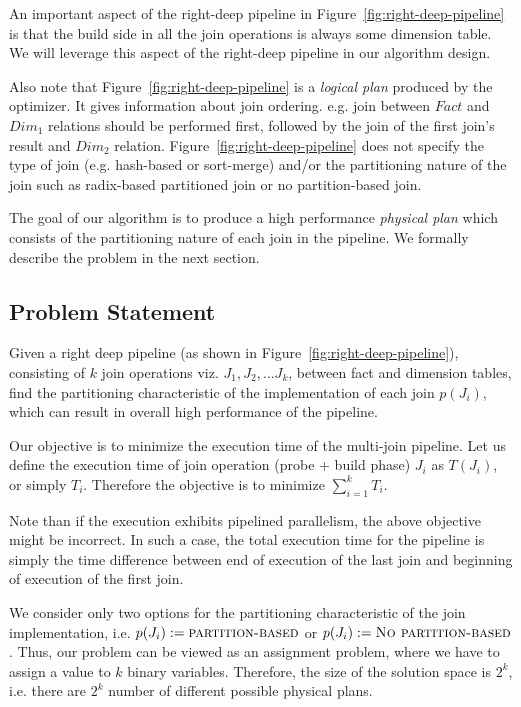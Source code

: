 An important aspect of the right-deep pipeline in Figure~\ref{fig:right-deep-pipeline} is that the build side in all the join operations is always some dimension table. 
We will leverage this aspect of the right-deep pipeline in our algorithm design. 

Also note that Figure~\ref{fig:right-deep-pipeline} is a \textit{logical plan} produced by the optimizer. 
It gives information about join ordering. e.g. join between $Fact$ and $Dim_1$ relations should be performed first, followed by the join of the first join's result and $Dim_2$ relation. 
Figure~\ref{fig:right-deep-pipeline} does not specify the type of join (e.g. hash-based or sort-merge) and/or the partitioning nature of the join such as radix-based partitioned join or no partition-based join. 

The goal of our algorithm is to produce a high performance \textit{physical plan} which consists of the partitioning nature of each join in the pipeline.
We formally describe the problem in the next section.

\subsection{Problem Statement}
Given a right deep pipeline (as shown in Figure~\ref{fig:right-deep-pipeline}), consisting of $k$ join operations viz. $J_1, J_2, \ldots J_k$, between fact and dimension tables, find the partitioning characteristic of the implementation of each join $p(J_i)$, which can result in overall high performance of the pipeline. 

Our objective is to minimize the execution time of the multi-join pipeline. 
Let us define the execution time of join operation (probe + build phase) $J_i$ as $T(J_i)$, or simply $T_i$. 
Therefore the objective is to minimize $\sum\limits_{i=1}^{k}T_i$.

Note than if the execution exhibits pipelined parallelism, the above objective might be incorrect. 
In such a case, the total execution time for the pipeline is simply the time difference between end of execution of the last join and beginning of execution of the first join. 

We consider only two options for the partitioning characteristic of the join implementation, i.e. $p(J_i) := \textsc{partition-based}$ or $p(J_i) := \textsc{No partition-based}$. 
Thus, our problem can be viewed as an assignment problem, where we have to assign a value to $k$ binary variables.
Therefore, the size of the solution space is $2^k$, i.e. there are $2^k$ number of different possible physical plans. 

